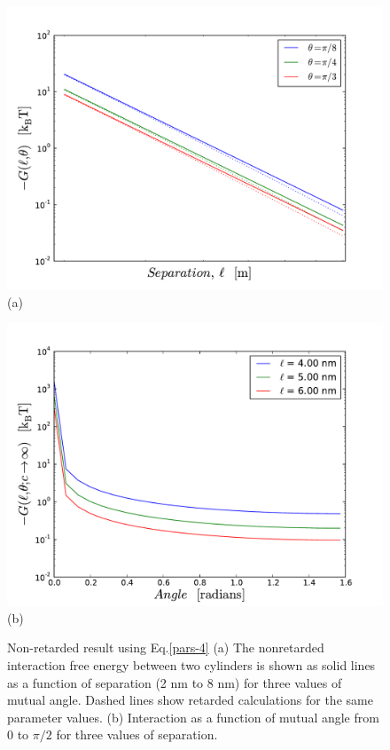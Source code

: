 \documentclass[onecolumn,letterpaper,amsmath,amssymb,floatfix,aps,superscriptaddress]{revtex4}
\begin{document}
\begin{figure}[t!]
\begin{center}
\begin{minipage}[b]{0.40\textwidth}
\begin{center}
\includegraphics[width=1.2\textwidth]{./140220_cyl-cyl/Compare_full_nonret_G_vs_l.pdf} (a)
\end{center}
\end{minipage}
\hskip 43pt
\begin{minipage}[b]{0.40\textwidth}
\begin{center}
\includegraphics[width=1.2\textwidth]{./140220_cyl-cyl/Nonret_skew_G_vs_theta.pdf} (b)
\end{center}
\end{minipage}
\caption{Non-retarded result using Eq.\ref{pars-4} (a) The nonretarded interaction free energy between two cylinders is shown as solid lines as a function of separation (2 nm to 8 nm) for three values of mutual angle. Dashed lines show retarded calculations for the same parameter values. (b) Interaction as a function of mutual angle from 0 to $\pi/2$ for three values of separation.}
\end{center}
\end{figure} 
\end{document}
